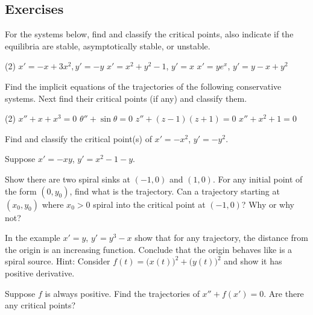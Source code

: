 \subsection{Exercises}

\begin{exercise}
For the systems below, find and classify the critical points, also indicate
if the equilibria are stable, asymptotically stable, or unstable.
\begin{tasks}(2)
\task $x'=-x+3x^2, y'=-y$
\task $x'=x^2+y^2-1$, $y'=x$
\task $x'=ye^x$, $y'=y-x+y^2$
\end{tasks}
\end{exercise}

\begin{exercise}
Find the implicit equations of the trajectories of the following
conservative systems.  Next find their critical points (if any) and classify them.
\begin{tasks}(2)
\task $x''+ x+x^3 = 0$
\task $\theta''+\sin \theta = 0$
\task $z''+ (z-1)(z+1) = 0$
\task $x''+ x^2+1 = 0$
\end{tasks}
\end{exercise}

\begin{exercise}
Find and classify the critical point(s) of $x' = -x^2$, $y' = -y^2$.
\end{exercise}

\begin{samepage}
\begin{exercise}
Suppose $x'=-xy$, $y'=x^2-1-y$.
\begin{tasks}
\task
Show there are two spiral sinks at
$(-1,0)$ and $(1,0)$.
\task
For any initial point of the form $(0,y_0)$, find what is the trajectory.
\task
Can a trajectory starting at $(x_0,y_0)$ where $x_0 > 0$ spiral into 
the critical point at $(-1,0)$?  Why or why not?
\end{tasks}
\end{exercise}
\end{samepage}

\begin{exercise} \label{exercise:increasing}
In the example $x'=y$, $y'=y^3-x$ show that for any trajectory, the distance
from the origin is an increasing function.
Conclude
that the origin behaves like is a spiral source.
Hint: Consider $f(t) =
{\bigl(x(t)\bigr)}^2 + 
{\bigl(y(t)\bigr)}^2$ and show it has positive derivative.
\end{exercise}


\begin{exercise}
Suppose $f$ is always positive.
Find the trajectories of $x''+f(x') = 0$.
Are there any critical points?
\end{exercise}

